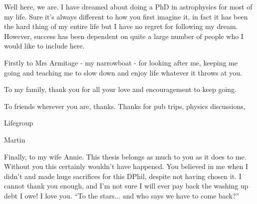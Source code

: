 \begin{acknowledgements}
Well here, we are. I have dreamed about doing a PhD in astrophysics for most of my life. Sure it's always different to how you first imagine it, in fact it has been the hard thing of my entire life but I have no regret for following my dream. However, success has been dependent on quite a large number of people who I would like to include here. 

Firstly to Mrs Armitage - my narrowboat - for looking after me, keeping me going and teaching me to slow down and enjoy life whatever it throws at you. 

To my family, thank you for all your love and encouragement to keep going.

To friends wherever you are, thanks. Thanks for pub trips, physics discussions, 

Lifegroup

Martin

Finally, to my wife Annie. This thesis belongs as much to you as it does to me. Without you this certainly wouldn't have happened. You believed in me when I didn't and made huge sacrifices for this DPhil, despite not having chosen it. I cannot thank you enough, and I'm not sure I will ever pay back the washing up debt I owe! I love you. ``To the stars... and who says we have to come back?''

\end{acknowledgements}